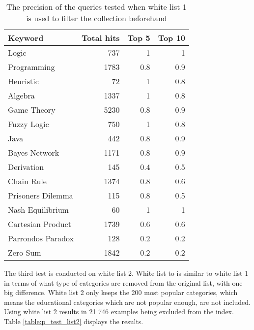 \begin{table}[H]
\centering
\begin{tabular} {|| p{15em} | r | r | r ||} 
 \hline
 Keyword & Total hits & Top 5 & Top 10 \\ [0.5ex] 
 \hline

Logic & 737 & 1 & 1 \\
Programming & 1783 & 0.8 & 0.9 \\
Heuristic & 72 & 1 & 0.8 \\
Algebra & 1337 & 1 & 0.8 \\
Game Theory & 5230 & 0.8 & 0.9 \\
\hline
Fuzzy Logic & 750 & 1 & 0.8 \\
Java & 442 & 0.8 & 0.9 \\
Bayes Network & 1171 & 0.8 & 0.9 \\
Derivation & 145 & 0.4 & 0.5 \\
\hline
Chain Rule & 1374 & 0.8 & 0.6 \\
Prisoners Dilemma & 115 & 0.8 & 0.5 \\
Nash Equilibrium & 60 & 1 & 1 \\
Cartesian Product & 1739 & 0.6 & 0.6 \\
Parrondos Paradox & 128 & 0.2 & 0.2 \\
Zero Sum & 1842 & 0.2 & 0.2 \\

 \hline
\end{tabular}
\caption{The precision of the queries tested when white list 1 is used to filter the collection beforehand}
\label{table:p_test_list1}
\end{table}

The third test is conducted on white list 2. White list to is similar to white list 1 in terms of what type of categories are removed from the original list, with one big difference. White list 2 only keeps the 200 most popular categories, which means the educational categories which are not popular enough, are not included. Using white list 2 results in 21 746 examples being excluded from the index. Table \ref{table:p_test_list2} displays the results.

